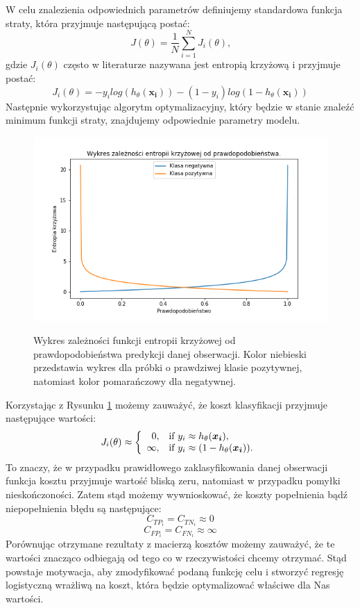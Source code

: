 \documentclass[inzynierska]{pwr_wmat_praca_dyplomowa}
\theoremstyle{plain}
\numberwithin{theorem}{chapter}
\theoremstyle{definition}
\numberwithin{theorem}{chapter}
\begin{document}
W celu znalezienia odpowiednich parametrów definiujemy standardowa funkcja straty, która przyjmuje następującą postać:
$$ J(\theta) = \frac{1}{N} \sum_{i=1}^N J_i(\theta) \text{,}$$
gdzie $J_i(\theta)$ często w literaturze nazywana jest entropią krzyżową i przyjmuje postać:
\begin{equation}
	\label{c-e}
	J_i(\theta) = -y_i log(h_{\theta}(\boldsymbol{x_i})) - (1-y_i) log(1 - h_{\theta}(\boldsymbol{x_i}))
\end{equation}
Następnie wykorzystując algorytm optymalizacyjny, który będzie w stanie znaleźć minimum funkcji straty, znajdujemy odpowiednie parametry modelu.

\begin{figure}[h]
	\includegraphics[width=\linewidth]{images/cross_entropy.png}
	\label{cross-entropy-plot}
	\caption{Wykres zależności funkcji entropii krzyżowej od prawdopodobieństwa predykcji danej obserwacji. Kolor niebieski przedstawia wykres dla próbki o prawdziwej klasie pozytywnej, natomiast kolor pomarańczowy dla negatywnej.}
\end{figure}

Korzystając z Rysunku \ref{cross-entropy-plot} możemy zauważyć, że koszt klasyfikacji przyjmuje następujące wartości:
$$
J_i(\theta) \approx \left\{
\begin{array}{rl}
0, &\mbox{if $y_i \approx h_{\theta}(\boldsymbol{x_i})$}, \\
\infty, &\mbox{if $y_i \approx (1 - h_{\theta}(\boldsymbol{x_i}))$}.
\end{array}{}
\right.
$$
To znaczy, że w przypadku prawidłowego zaklasyfikowania danej obserwacji funkcja kosztu przyjmuje wartość bliską zeru, natomiast w przypadku pomyłki nieskończoności. Zatem stąd możemy wywnioskować, że koszty popełnienia bądź niepopełnienia błędu są następujące:
$$ C_{TP_i} = C_{TN_i} \approx 0 $$
$$ C_{FP_i} = C_{FN_i} \approx \infty $$
Porównując otrzymane rezultaty z macierzą kosztów możemy zauważyć, że te wartości znacząco odbiegają od tego co w rzeczywistości chcemy otrzymać. Stąd powstaje motywacja, aby zmodyfikować podaną funkcję celu i stworzyć regresję logistyczną wrażliwą na koszt, która będzie optymalizować właściwe dla Nas wartości.
\end{document}
